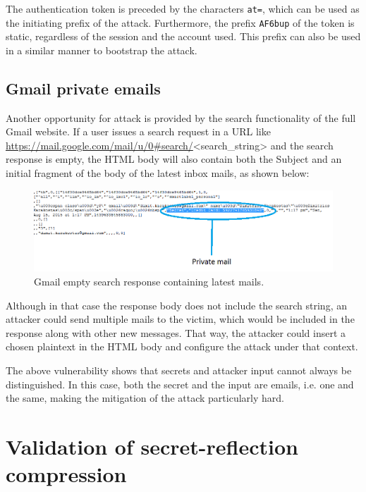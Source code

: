The authentication token is preceded by the characters \texttt{at=}, which can
be used as the initiating prefix of the attack. Furthermore, the prefix
\texttt{AF6bup} of the token is static, regardless of the session and the
account used. This prefix can also be used in a similar manner to bootstrap the
attack.

\subsection{Gmail private emails}\label{subsec:gmail_mail}

Another opportunity for attack is provided by the search functionality of the
full Gmail website. If a user issues a search request in a URL like
\url{https://mail.google.com/mail/u/0#search/}<search\_string> and the search
response is empty, the HTML body will also contain both the Subject and an
initial fragment of the body of the latest inbox mails, as shown below:

\begin{figure}[H] \caption{Gmail empty search response containing latest mails.}
\centering
\includegraphics[width=1.1\textwidth]{diagrams/gmail_plain_response.png}\end{figure}

Although in that case the response body does not include the search string, an
attacker could send multiple mails to the victim, which would be included in the
response along with other new messages. That way, the attacker could insert a
chosen plaintext in the HTML body and configure the attack under that context.

The above vulnerability shows that secrets and attacker input cannot always be
distinguished. In this case, both the secret and the input are emails, i.e. one
and the same, making the mitigation of the attack particularly hard.

\section{Validation of secret-reflection compression}\label{sec:mitmproxy}

